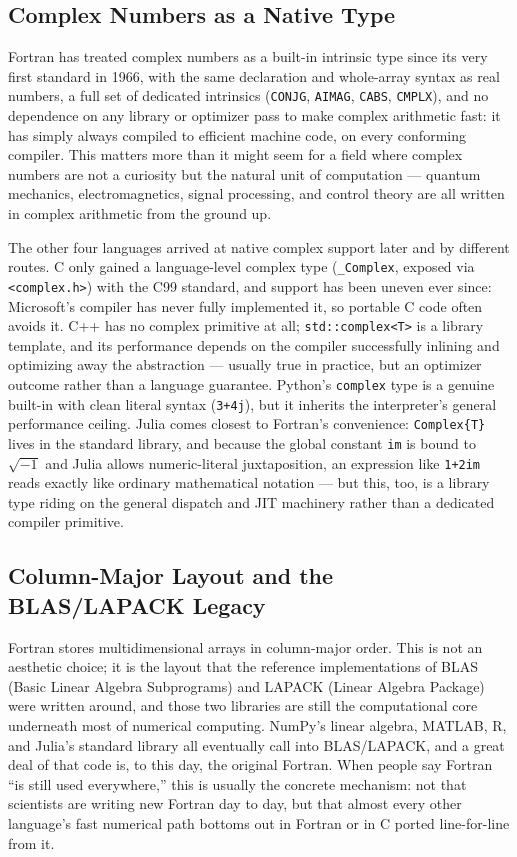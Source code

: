 \subsection{Complex Numbers as a Native Type}

Fortran has treated complex numbers as a built-in intrinsic type since its very first standard in 1966, with the same declaration and whole-array syntax as real numbers, a full set of dedicated intrinsics (\texttt{CONJG}, \texttt{AIMAG}, \texttt{CABS}, \texttt{CMPLX}), and no dependence on any library or optimizer pass to make complex arithmetic fast: it has simply always compiled to efficient machine code, on every conforming compiler. This matters more than it might seem for a field where complex numbers are not a curiosity but the natural unit of computation --- quantum mechanics, electromagnetics, signal processing, and control theory are all written in complex arithmetic from the ground up.

The other four languages arrived at native complex support later and by different routes. C only gained a language-level complex type (\verb|_Complex|, exposed via \verb|<complex.h>|) with the C99 standard, and support has been uneven ever since: Microsoft's compiler has never fully implemented it, so portable C code often avoids it. C++ has no complex primitive at all; \verb|std::complex<T>| is a library template, and its performance depends on the compiler successfully inlining and optimizing away the abstraction --- usually true in practice, but an optimizer outcome rather than a language guarantee. Python's \texttt{complex} type is a genuine built-in with clean literal syntax (\verb|3+4j|), but it inherits the interpreter's general performance ceiling. Julia comes closest to Fortran's convenience: \verb|Complex{T}| lives in the standard library, and because the global constant \texttt{im} is bound to $\sqrt{-1}$ and Julia allows numeric-literal juxtaposition, an expression like \verb|1+2im| reads exactly like ordinary mathematical notation --- but this, too, is a library type riding on the general dispatch and JIT machinery rather than a dedicated compiler primitive.

\subsection{Column-Major Layout and the BLAS/LAPACK Legacy}

Fortran stores multidimensional arrays in column-major order. This is not an aesthetic choice; it is the layout that the reference implementations of BLAS (Basic Linear Algebra Subprograms) and LAPACK (Linear Algebra Package) were written around, and those two libraries are still the computational core underneath most of numerical computing. NumPy's linear algebra, MATLAB, R, and Julia's standard library all eventually call into BLAS/LAPACK, and a great deal of that code is, to this day, the original Fortran. When people say Fortran ``is still used everywhere,'' this is usually the concrete mechanism: not that scientists are writing new Fortran day to day, but that almost every other language's fast numerical path bottoms out in Fortran or in C ported line-for-line from it.

